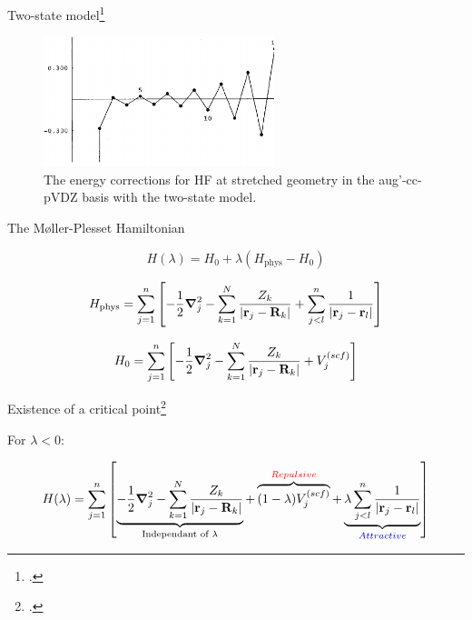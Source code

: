 \documentclass[xcolor=x11names,compress]{beamer}
\renewcommand{\(}{\begin{columns}}
\renewcommand{\)}{\end{columns}}
\newcommand{\<}[1]{\begin{column}{#1}}
\renewcommand{\>}{\end{column}}
\begin{document}
\begin{frame}{Two-state model\footcite{olsen_divergence_2000}}
  
\begin{figure}
    \centering
    \includegraphics[width=0.6\textwidth]{figure-fig14.png}
    \caption{\centering The energy corrections for HF at stretched geometry in the aug'-cc-pVDZ basis with the two-state model.}
    \label{fig:my_label}
\end{figure}

\end{frame}

\begin{frame}{The Møller-Plesset Hamiltonian}

\begin{equation}
H(\lambda)=H_0 + \lambda (H_\text{phys} - H_0)    
\end{equation}

\begin{equation}
    H_\text{phys}=\sum\limits_{j=1}^{n}\left[ -\frac{1}{2}\grad_j^2 - \sum\limits_{k=1}^{N} \frac{Z_k}{|\vb{r}_j-\vb{R}_k|}+\sum\limits_{j<l}^{n}\frac{1}{|\vb{r}_j-\vb{r}_l|}\right]
\end{equation}

\begin{equation}
    H_0=\sum\limits_{j=1}^{n}\left[ -\frac{1}{2}\grad_j^2 - \sum\limits_{k=1}^{N} \frac{Z_k}{|\vb{r}_j-\vb{R}_k|}+V_j^{(scf)}\right]
\end{equation}
    
\end{frame}

\begin{frame}{Existence of a critical point\footcite{stillinger_mollerplesset_2000}}

For $\lambda<0$:

\begin{equation*}
    H(\lambda)=\sum\limits_{j=1}^{n}\left[ \underbrace{-\frac{1}{2}\grad_j^2 - \sum\limits_{k=1}^{N} \frac{Z_k}{|\vb{r}_j-\vb{R}_k|}}_{\text{Independant of }\lambda} + \overbrace{(1-\lambda)V_j^{(scf)}}^{\textcolor{red}{Repulsive}}+\underbrace{\lambda\sum\limits_{j<l}^{n}\frac{1}{|\vb{r}_j-\vb{r}_l|}}_{\textcolor{blue}{Attractive}}  \right]
\end{equation*}

\end{frame}
\end{document}
